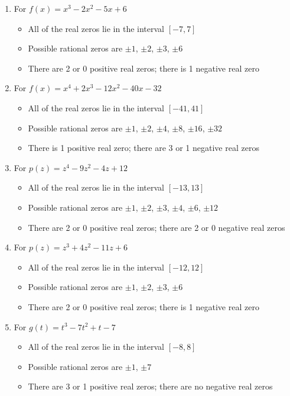 \begin{enumerate}

\item For $f(x) = x^{3} - 2x^{2} - 5x + 6$
\begin{itemize}
\item  All of the real zeros lie in the interval $[-7,7]$
\item  Possible rational zeros are $\pm 1$, $\pm 2$, $\pm 3$, $\pm 6$
\item  There are 2 or 0 positive real zeros;  there is 1 negative real zero
\end{itemize}

\item For  $f(x) = x^{4} + 2x^{3} - 12x^{2} - 40x - 32$
\begin{itemize}
\item  All of the real zeros lie in the interval $[-41,41]$
\item  Possible rational zeros are $\pm 1$, $\pm 2$, $\pm 4$, $\pm 8$, $\pm 16$, $\pm 32$
\item  There is 1 positive real zero;  there are 3 or 1 negative real zeros
\end{itemize}

\item For  $p(z) = z^{4} - 9z^{2} - 4z + 12$
\begin{itemize}
\item  All of the real zeros lie in the interval $[-13,13]$
\item  Possible rational zeros are $\pm 1$, $\pm 2$, $\pm 3$, $\pm 4$, $\pm 6$, $\pm 12$
\item  There are 2 or 0 positive real zeros;  there are 2 or 0 negative real zeros
\end{itemize}

\item For  $p(z) = z^{3} + 4z^{2} - 11z + 6$
\begin{itemize}
\item  All of the real zeros lie in the interval $[-12,12]$
\item  Possible rational zeros are $\pm 1$, $\pm 2$, $\pm 3$, $\pm 6$
\item  There are 2 or 0 positive real zeros;  there is 1 negative real zero
\end{itemize}

\item For   $g(t) = t^{3} - 7t^{2} + t - 7$
\begin{itemize}
\item  All of the real zeros lie in the interval $[-8,8]$
\item  Possible rational zeros are $\pm 1$, $\pm 7$
\item  There are 3 or 1 positive real zeros;  there are no negative real zeros
\end{itemize}


\end{enumerate}
